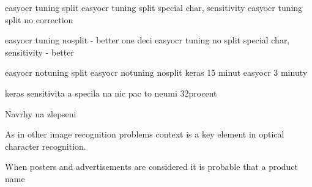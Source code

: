 easyocr tuning split
easyocr tuning split special char, sensitivity
easyocr tuning split no correction

easyocr tuning nosplit - better one deci
easyocr tuning no split special char, sensitivity - better

easyocr notuning split
easyocr notuning nosplit 
keras 15 minut easyocr 3 minuty


keras sensitivita a specila na nic pac to neumi 32procent

Navrhy na zlepseni

As in other image recognition problems context is a key element in optical character recognition. 

When posters and advertisements are considered it is probable that a product name 